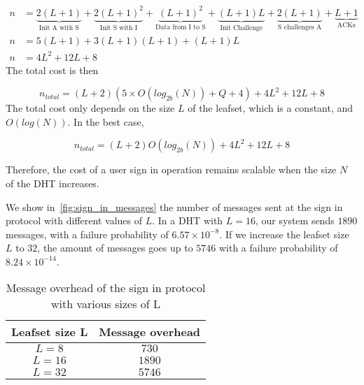     \begin{align}
      n &= \underbrace{2(L+1)}_\text{Init A with S} +
           \underbrace{2(L+1)^2}_\text{Init S with I} +
           \underbrace{(L+1)^2}_\text{Data from I to S} +
           \underbrace{(L+1)L}_\text{Init Challenge} +
           \underbrace{2(L+1)}_\text{S challenges A} +
           \underbrace{L+1}_\text{ACKs}\\
      n &= 5(L+1) + 3(L+1)(L+1)+ (L+1)L\\
      n &= 4L^2 +12L + 8 
    \end{align}
     The total cost is then

    $$
      n_{total} = (L +2)(5 \times O(log_{2b}(N)) + Q + 4) + 4L^2 +12L + 8 
    $$    
    The total cost only depends on the size $L$ of the leafset, which is a
constant, and $O(log(N))$. In the best case, 

    $$
      n_{total} = (L +2)O(log_{2b}(N)) + 4L^2 +12L + 8 
    $$

    Therefore, the cost of a user sign in operation remains
scalable when the size $N$ of the DHT increases.

    We show in~\ref{fig:sign_in_messages} the number of messages sent at
the sign in protocol with different values of $L$. In a DHT with
$L = 16$, our system sends $1890$ messages, with a failure probability of
 $6.57 \times 10^{-8}$. If we increase the leafset size $L$ to $32$, the amount of
messages goes up to $5746$ with a failure probability of $8.24 \times 10^{-14}$.



\begin{table}
  \centering
  \footnotesize
  \begin{tabular}{|c|c|}
    \hline
     \textbf{Leafset size L} & \textbf{Message overhead}\\
    \hline
      $L = 8$ & $730$\\
    \hline
      $L = 16$ & $1890$\\
    \hline
      $L = 32$ & $5746$\\
    \hline
  \end{tabular}
  \caption{Message overhead of the sign in protocol with various sizes of L}
  \label{tab:sign_in_messages}
\end{table}


